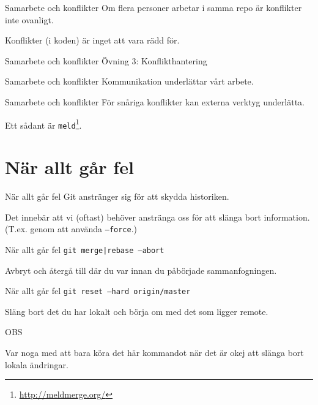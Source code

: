 \documentclass[11pt,xetex]{beamer}
\begin{document}
\begin{frame}{Samarbete och konflikter}
  \Large
  Om flera personer arbetar i samma repo är konflikter inte ovanligt.

  Konflikter (i koden) är inget att vara rädd för.
\end{frame}

\begin{frame}{Samarbete och konflikter}
  \Large
  Övning 3: Konflikthantering
\end{frame}

\begin{frame}{Samarbete och konflikter}
  \Large
  Kommunikation underlättar vårt arbete.
\end{frame}

\begin{frame}{Samarbete och konflikter}
  \Large
  För snåriga konflikter kan externa verktyg underlätta.

  Ett sådant är \texttt{meld}\footnote{\url{http://meldmerge.org/}}.
\end{frame}


\section*{När allt går fel}

\begin{frame}{När allt går fel}
  \Large
  Git anstränger sig för att skydda historiken.

  \normalsize
  Det innebär att vi (oftast) behöver anstränga oss för att slänga bort
  information. (T.ex. genom att använda \texttt{--force}.)
\end{frame}

\begin{frame}{När allt går fel}
  \Large
  \texttt{git {merge|rebase} --abort}

  \normalsize
  Avbryt och återgå till där du var innan du påbörjade sammanfogningen.
\end{frame}

\begin{frame}{När allt går fel}
  \Large
  \texttt{git reset --hard origin/master}

  \normalsize
  Släng bort det du har lokalt och börja om med det som ligger remote.
  \pause

  \vspace{1em}
  \alert{OBS}

  \normalsize
  Var noga med att bara köra det här kommandot när det är okej att slänga bort
  lokala ändringar.
\end{frame}
\end{document}
